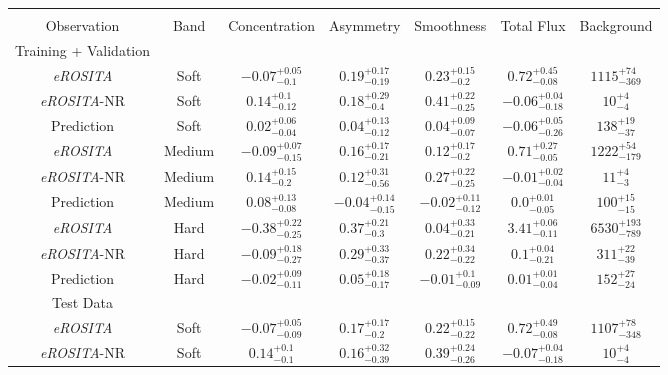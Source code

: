 \documentclass[twocolumn, 11pt]{aastex63}%
\begin{document}
\begin{table}[h!]
\centering
 \begin{tabular}{||c c c c c c c||} 
 \hline\hline
  &  &  &  &  & & \\
 Observation & Band & Concentration & Asymmetry & Smoothness & Total Flux & Background\\ [0.5ex] 
 \hline\hline
 Training + Validation &  &  &  &  & & \\
 \hline\hline
 \textit{eROSITA} & Soft & $-0.07_{-0.1}^{+0.05}$ & $0.19_{-0.19}^{+0.17}$ & $0.23_{-0.2}^{+0.15}$ & $0.72_{-0.08}^{+0.45}$& $1115_{-369}^{+74}$ \\[1ex] 
 \textit{eROSITA}-NR & Soft & $0.14_{-0.12}^{+0.1}$ & $0.18_{-0.4}^{+0.29}$ & $0.41_{-0.25}^{+0.22}$ & $-0.06_{-0.18}^{+0.04}$& $10_{-4}^{+4}$ \\[1ex]
 Prediction & Soft & $0.02_{-0.04}^{+0.06}$ & $0.04_{-0.12}^{+0.13}$ & $0.04_{-0.07}^{+0.09}$ & $-0.06_{-0.26}^{+0.05}$& $138_{-37}^{+19}$ \\[1ex]
 \hline
 \textit{eROSITA} & Medium & $-0.09_{-0.15}^{+0.07}$ & $0.16_{-0.21}^{+0.17}$ & $0.12_{-0.2}^{+0.17}$ & $0.71_{-0.05}^{+0.27}$& $1222_{-179}^{+54}$ \\[1ex] 
 \textit{eROSITA}-NR & Medium & $0.14_{-0.2}^{+0.15}$ & $0.12_{-0.56}^{+0.31}$ & $0.27_{-0.25}^{+0.22}$ & $-0.01_{-0.04}^{+0.02}$& $11_{-3}^{+4}$ \\[1ex]
 Prediction & Medium & $0.08_{-0.08}^{+0.13}$ & $-0.04_{-0.15}^{+0.14}$ & $-0.02_{-0.12}^{+0.11}$ & $0.0_{-0.05}^{+0.01}$& $100_{-15}^{+15}$ \\[1ex]
 \hline
 \textit{eROSITA} & Hard & $-0.38_{-0.25}^{+0.22}$ & $0.37_{-0.3}^{+0.21}$ & $0.04_{-0.21}^{+0.33}$ & $3.41_{-0.11}^{+0.06}$& $6530_{-789}^{+193}$ \\[1ex] 
 \textit{eROSITA}-NR & Hard & $-0.09_{-0.27}^{+0.18}$ & $0.29_{-0.37}^{+0.33}$ & $0.22_{-0.22}^{+0.34}$ & $0.1_{-0.21}^{+0.04}$& $311_{-39}^{+22}$ \\[1ex]
 Prediction & Hard & $-0.02_{-0.11}^{+0.09}$ & $0.05_{-0.17}^{+0.18}$ & $-0.01_{-0.09}^{+0.1}$ & $0.01_{-0.04}^{+0.01}$& $152_{-24}^{+27}$ \\[1ex]
 \hline\hline
 Test Data  &  &  &  &  &  &\\
 \hline\hline
  \textit{eROSITA} & Soft & $-0.07_{-0.09}^{+0.05}$ & $0.17_{-0.2}^{+0.17}$& $0.22_{-0.22}^{+0.15}$ & $0.72_{-0.08}^{+0.49}$& $1107_{-348}^{+78}$ \\[1ex] 
 \textit{eROSITA}-NR & Soft & $0.14_{-0.1}^{+0.1}$ & $0.16_{-0.39}^{+0.32}$ & $0.39_{-0.26}^{+0.24}$ & $-0.07_{-0.18}^{+0.04}$& $10_{-4}^{+4}$ \\[1ex]

\end{tabular}
\end{table}
\end{document}
